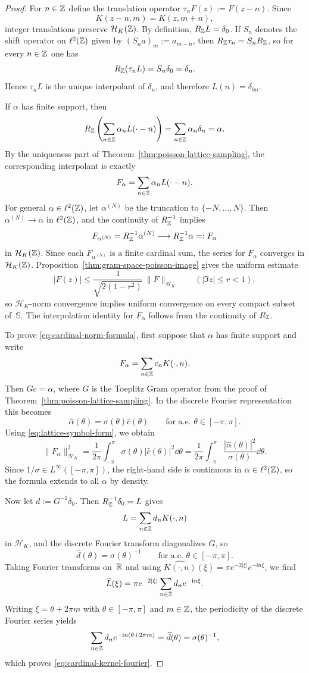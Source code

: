 \begin{proof}
For $n\in\mathbb{Z}$ define the translation operator
$\tau_nF(z):=F(z-n)$.  Since
\[
K(z-n,m)=K(z,m+n),
\]
integer translations preserve $\mathcal H_K(\mathbb{Z})$.  By definition,
$R_{\mathbb{Z}}L=\delta_0$.  If $S_n$ denotes the shift operator on
$\ell^2(\mathbb{Z})$ given by $(S_na)_m:=a_{m-n}$, then
$R_{\mathbb{Z}}\tau_n=S_nR_{\mathbb{Z}}$, so for every $n\in\mathbb{Z}$
one has
\[
R_{\mathbb{Z}}(\tau_nL)=S_n\delta_0=\delta_n.
\]
Hence $\tau_nL$ is the unique interpolant of $\delta_n$, and therefore
$L(n)=\delta_{0n}$.

If $\alpha$ has finite support, then
\[
R_{\mathbb{Z}}\left(\sum_{n\in\mathbb{Z}}\alpha_nL(\cdot-n)\right)
=\sum_{n\in\mathbb{Z}}\alpha_n\delta_n
=\alpha.
\]
By the uniqueness part of
Theorem~\ref{thm:poisson-lattice-sampling}, the corresponding interpolant
is exactly
\[
F_\alpha=\sum_{n\in\mathbb{Z}}\alpha_nL(\cdot-n).
\]
For general $\alpha\in\ell^2(\mathbb{Z})$, let $\alpha^{(N)}$ be the truncation
to $\{-N,\dots,N\}$.  Then $\alpha^{(N)}\to\alpha$ in $\ell^2(\mathbb{Z})$, and
the continuity of $R_{\mathbb{Z}}^{-1}$ implies
\[
F_{\alpha^{(N)}}=R_{\mathbb{Z}}^{-1}\alpha^{(N)}
\longrightarrow
R_{\mathbb{Z}}^{-1}\alpha=:F_\alpha
\]
in $\mathcal H_K(\mathbb{Z})$.  Since each $F_{\alpha^{(N)}}$ is a finite
cardinal sum, the series for $F_\alpha$ converges in $\mathcal H_K(\mathbb{Z})$.
Proposition~\ref{thm:gram-space-poisson-image} gives the uniform estimate
\[
|F(z)|\le \frac{1}{\sqrt{2(1-r^2)}}\,\|F\|_{\mathcal H_K}
\qquad(|\Im z|\le r<1),
\]
so $\mathcal H_K$-norm convergence implies uniform convergence on every
compact subset of~$\mathbb S$.  The interpolation identity for $F_\alpha$
follows from the continuity of $R_{\mathbb{Z}}$.

To prove \eqref{eq:cardinal-norm-formula}, first suppose that $\alpha$
has finite support and write
\[
F_\alpha=\sum_{n\in\mathbb{Z}}c_nK(\cdot,n).
\]
Then $Gc=\alpha$, where $G$ is the Toeplitz Gram operator from the proof
of Theorem~\ref{thm:poisson-lattice-sampling}.  In the discrete Fourier
representation this becomes
\[
\widehat\alpha(\theta)=\sigma(\theta)\widehat c(\theta)
\qquad\text{for a.e. }\theta\in[-\pi,\pi].
\]
Using \eqref{eq:lattice-symbol-form}, we obtain
\[
\|F_\alpha\|_{\mathcal H_K}^2
=\frac{1}{2\pi}\int_{-\pi}^{\pi}
\sigma(\theta)|\widehat c(\theta)|^2\dd\theta
=\frac{1}{2\pi}\int_{-\pi}^{\pi}
\frac{|\widehat\alpha(\theta)|^2}{\sigma(\theta)}\dd\theta.
\]
Since $1/\sigma\in L^\infty([-\pi,\pi])$, the right-hand side is
continuous in $\alpha\in\ell^2(\mathbb{Z})$, so the formula extends to all
$\alpha$ by density.

Now let $d:=G^{-1}\delta_0$.  Then $R_{\mathbb{Z}}^{-1}\delta_0=L$ gives
\[
L=\sum_{n\in\mathbb{Z}}d_nK(\cdot,n)
\]
in $\mathcal H_K$, and the discrete Fourier transform diagonalizes $G$,
so
\[
\widehat d(\theta)=\sigma(\theta)^{-1}
\qquad\text{for a.e. }\theta\in[-\pi,\pi].
\]
Taking Fourier transforms on~$\mathbb{R}$ and using
$\widehat{K(\cdot,n)}(\xi)=\pi e^{-2|\xi|}e^{-\ii n\xi}$, we find
\[
\widehat L(\xi)
=\pi e^{-2|\xi|}\sum_{n\in\mathbb{Z}}d_ne^{-\mathrm{i} n\xi}.
\]
Writing $\xi=\theta+2\pi m$ with $\theta\in[-\pi,\pi]$ and $m\in\mathbb{Z}$,
the periodicity of the discrete Fourier series yields
\[
\sum_{n\in\mathbb{Z}}d_ne^{-\mathrm{i} n(\theta+2\pi m)}
=\widehat d(\theta)
=\sigma(\theta)^{-1},
\]
which proves \eqref{eq:cardinal-kernel-fourier}.
\end{proof}

